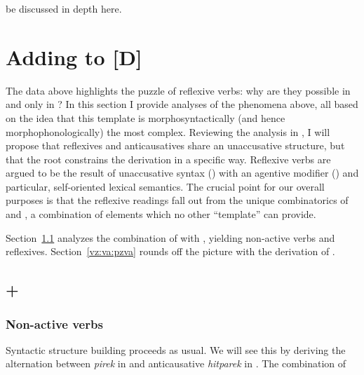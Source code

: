 \begin{exe}
\begin{xlist}
\begin{xlist}
\begin{exe}
\begin{xlist}
\begin{xlist}
\begin{exe}
\begin{xlist}
\begin{xlist}
\begin{exe}
\begin{exe}
\begin{xlist}
\begin{exe}
\begin{exe}
\begin{xlist}
\begin{exe}
\begin{exe}
\begin{exe}
\begin{exe}
\begin{exe}
\begin{xlist}
\begin{exe}
\begin{xlist}
\begin{exe}
\begin{exe}
\begin{xlist}
\begin{exe}
\begin{xlist}
\begin{exe}
\begin{xlist}
\begin{exe}
\begin{exe}
\begin{exe}
\begin{xlist}
\begin{exe}
\begin{exe}
\begin{exe}
\begin{xlist}
\begin{exe}
\begin{xlist}
\begin{exe}
\begin{xlist}
\begin{exe}
\begin{xlist}
\begin{exe}
\begin{exe}
\begin{exe}
\begin{exe}
\begin{xlist}
\begin{exe}
\begin{xlist}
\begin{exe}
\begin{xlist}
\begin{exe}
\begin{xlist}
\begin{exe}
\begin{xlist}
\begin{exe}
\begin{xlist}
\begin{exe}
\begin{exe}
\begin{exe}
\begin{exe}
\begin{xlist}
\begin{exe}
\begin{xlist}
\begin{exe}
\begin{xlist}
\begin{exe}
\begin{exe}
\begin{xlist}
\begin{exe}
\begin{xlist}
\begin{exe}
\begin{exe}
\begin{exe}
\begin{exe}
\begin{xlist}
\begin{xlist}
\begin{exe}
\begin{xlist}
\begin{exe}
\begin{exe}
\begin{exe}
\begin{xlist}
\begin{exe}
\begin{exe}
\begin{xlist}
\begin{exe}
\begin{exe}
\begin{exe}
\begin{xlist}
\begin{xlist}
\begin{exe}
\begin{xlist}
\begin{exe}
\begin{exe}
\begin{exe}
\begin{exe}
\begin{xlist}
be discussed in depth here.


\section{Adding {\va} to [\textminus{}D]} \label{vz:va}
The data above highlights the puzzle of reflexive verbs: why are they possible in {\thit} and only in {\thit}? In this section I provide analyses of the phenomena above, all based on the idea that this template is morphosyntactically (and hence morphophonologically) the most complex. Reviewing the analysis in \cite{kastner17gjgl}, I will propose that reflexives and anticausatives share an unaccusative structure, but that the root constrains the derivation in a specific way. Reflexive verbs are argued to be the result of unaccusative syntax (\vz) with an agentive modifier (\va) and particular, self-oriented lexical semantics. The crucial point for our overall purposes is that the reflexive readings fall out from the unique combinatorics of {\vz} and {\va}, a combination of elements which no other ``template'' can provide.

Section~\ref{vz:va:vzva} analyzes the combination of {\va} with {\vz}, yielding non-active verbs and reflexives. Section~\ref{vz:va:pzva} rounds off the picture with the derivation of .

	\subsection{{\va} + {\vz}} \label{vz:va:vzva}
		\subsubsection{Non-active verbs} \label{vz:va:vzva:nact}
Syntactic structure building proceeds as usual. We will see this by deriving the alternation between  \emph{pirek} in {\tpie} and anticausative \emph{hitparek} in {\thit}. The combination of 
\end{xlist}
\end{exe}
\end{exe}
\end{exe}
\end{exe}
\end{xlist}
\end{exe}
\end{xlist}
\end{xlist}
\end{exe}
\end{exe}
\end{exe}
\end{xlist}
\end{exe}
\end{exe}
\end{xlist}
\end{exe}
\end{exe}
\end{exe}
\end{xlist}
\end{exe}
\end{xlist}
\end{xlist}
\end{exe}
\end{exe}
\end{exe}
\end{exe}
\end{xlist}
\end{exe}
\end{xlist}
\end{exe}
\end{exe}
\end{xlist}
\end{exe}
\end{xlist}
\end{exe}
\end{xlist}
\end{exe}
\end{exe}
\end{exe}
\end{exe}
\end{xlist}
\end{exe}
\end{xlist}
\end{exe}
\end{xlist}
\end{exe}
\end{xlist}
\end{exe}
\end{xlist}
\end{exe}
\end{xlist}
\end{exe}
\end{exe}
\end{exe}
\end{exe}
\end{xlist}
\end{exe}
\end{xlist}
\end{exe}
\end{xlist}
\end{exe}
\end{xlist}
\end{exe}
\end{exe}
\end{exe}
\end{xlist}
\end{exe}
\end{exe}
\end{exe}
\end{xlist}
\end{exe}
\end{xlist}
\end{exe}
\end{xlist}
\end{exe}
\end{exe}
\end{xlist}
\end{exe}
\end{xlist}
\end{exe}
\end{exe}
\end{exe}
\end{exe}
\end{exe}
\end{xlist}
\end{exe}
\end{exe}
\end{xlist}
\end{exe}
\end{exe}
\end{xlist}
\end{xlist}
\end{exe}
\end{xlist}
\end{xlist}
\end{exe}
\end{xlist}
\end{xlist}
\end{exe}
